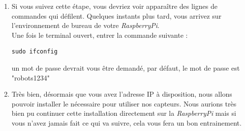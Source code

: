 \begin{enumerate}
	\item Si vous suivez cette étape, vous devriez voir apparaître des lignes de commandes qui défilent. Quelques instants plus tard, vous arrivez sur l'environnement de bureau de votre \textit{RaspberryPi}.\\
Une fois le terminal ouvert, entrer la commande suivante :\\
\begin{lstlisting}[style=MyBashStyle]
	sudo ifconfig
\end{lstlisting}
un mot de passe devrait vous être demandé, par défaut, le mot de passe est "robots1234"
	\item Très bien, désormais que vous avez l'adresse IP à disposition, nous allons pouvoir installer le nécessaire pour utiliser nos capteurs. Nous aurions très bien pu continuer cette installation directement sur la \textit{RaspberryPi} mais si vous n'avez jamais fait ce qui va suivre, cela vous fera un bon entrainement.\\


\end{enumerate}
